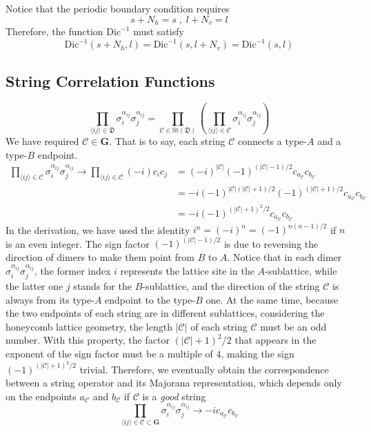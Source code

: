 \documentclass[12font]{article}
\numberwithin{equation}{section}    %
\theoremstyle{definition}
\newcommand{\anglelr}[1]{\langle #1 \rangle}
\newcommand{\lr}[1]{\left(  #1  \right)}
\newcommand{\abs}[1]{\left|  #1  \right|}
\newcommand{\mrm}[1]{\mathrm{#1}}
\newcommand{\bo}[1]{\mathbf{#1}}
\newcommand{\dimer}[2]{\sigma_{#1}^{\alpha_{#1#2}}\sigma_{#2}^{\alpha_{#1#2}}}
\begin{document}
Notice that the periodic boundary condition requires
\[
    s + N_h = s \;,\; l + N_v = l
\]
Therefore, the function $\mrm{Dic}^{-1}$ must satisfy
\[
    \mrm{Dic}^{-1}(s+N_h,l) = \mrm{Dic}^{-1}(s,l+N_v) = \mrm{Dic}^{-1}(s,l)
\]

\subsection{String Correlation Functions}
\[
\prod_{\anglelr{ij}\in\mathfrak{D}}
    \dimer{i}{j}
=
\prod_{\mathcal{C} \in \mrm{St}(\mathfrak{D})}
\lr{
    \prod_{\anglelr{ij}\in\mathcal{C}}
    \dimer{i}{j}
}
\]
We have required $\mathcal{C} \in \bo{G}$. That is to say, each string $\mathcal{C}$ connects a type-$A$ and a type-$B$ endpoint.
\begin{align*}
    \prod_{\anglelr{ij}\in\mathcal{C}}
    \dimer{i}{j}
    \to
    \prod_{\anglelr{ij}\in\mathcal{C}}
        (-i) c_ic_j 
    &=
    (-i)^{\abs{\mathcal{C}}} (-1)^{(\abs{\mathcal{C}} - 1)/2}c_{a_{\mathcal{C}}}c_{b_{\mathcal{C}}} \\
    &=
    -i
    (-1)^{\abs{\mathcal{C}}(\abs{\mathcal{C}}+1)/2} (-1)^{(\abs{\mathcal{C}} + 1)/2}c_{a_{\mathcal{C}}}c_{b_{\mathcal{C}}} \\
    &= -i (-1)^{(\abs{\mathcal{C}} + 1)^2/2} c_{a_{\mathcal{C}}}c_{b_{\mathcal{C}}}
\end{align*}
In the derivation, we have used the identity $i^{n} = (-i)^n = (-1)^{n(n-1)/2}$ if $n$ is an even integer. The sign factor $(-1)^{(\abs{\mathcal{C}}-1)/2}$ is due to reversing the direction of dimers to make them point from $B$ to $A$. Notice that in each dimer $\dimer{i}{j}$, the former index $i$ represents the lattice site in the $A$-sublattice, while the latter one $j$ stands for the $B$-sublattice, and the direction of the string $\mathcal{C}$ is always from its type-$A$ endpoint to the type-$B$ one. At the same time, because the two endpoints of each string are in different sublattices, considering the honeycomb lattice geometry, the length $\abs{\mathcal{C}}$ of each string $\mathcal{C}$ must be an odd number. With this property, the factor $(\abs{\mathcal{C}} + 1)^2/2$ that appears in the exponent of the sign factor must be a multiple of $4$, making the sign $(-1)^{(\abs{\mathcal{C}} + 1)^2/2}$ trivial. Therefore, we eventually obtain the correspondence between a string operator and its Majorana representation, which depends only on the endpoints $a_\mathcal{C}$ and $b_\mathcal{C}$ if $\mathcal{C}$ is a \textit{good} string
\begin{equation}
    \prod_{\anglelr{ij}\in\mathcal{C} \subset \bo{G}}
    \dimer{i}{j} 
    \to 
    -i c_{a_{\mathcal{C}}}c_{b_{\mathcal{C}}}
\end{equation}
\end{document}
